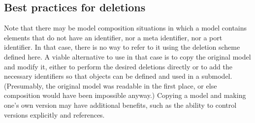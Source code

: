 

\subsection{Best practices for deletions}
\label{best-practices-deletions}

Note that there may be model composition situations in which a model
contains elements that do not have an identifier, nor a meta identifier,
nor a port identifier.  In that case, there is no way to refer to it
using the deletion scheme defined here.  A viable alternative to use in
that case is to copy the original model and modify it, either to perform
the desired deletions directly or to add the necessary identifiers so
that \Deletion objects can be defined and used in a submodel.
(Presumably, the original model was readable in the first place, or else
composition would have been impossible anyway.)  Copying a model and
making one's own version may have additional benefits, such as the
ability to control versions explicitly and references.

